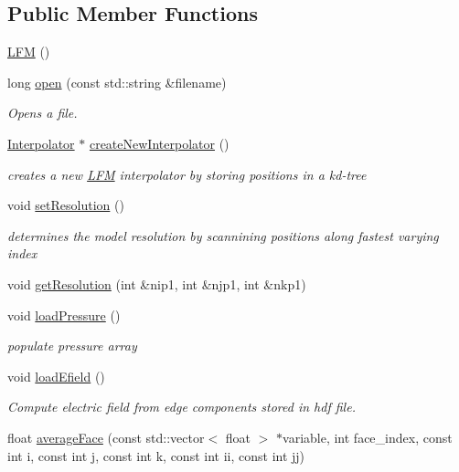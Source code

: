\subsection*{Public Member Functions}
\begin{DoxyCompactItemize}
\item 
\hyperlink{classccmc_1_1_l_f_m_a9fb6554dddcf4bb70bbb19622130cf69}{L\-F\-M} ()
\item 
long \hyperlink{classccmc_1_1_l_f_m_a8a9e74e6951db85a54cffbf6c1305f9f}{open} (const std\-::string \&filename)
\begin{DoxyCompactList}\small\item\em Opens a file.  \end{DoxyCompactList}\item 
\hyperlink{classccmc_1_1_interpolator}{Interpolator} $\ast$ \hyperlink{classccmc_1_1_l_f_m_a6cda025f32e66de186e723f7d16e8639}{create\-New\-Interpolator} ()
\begin{DoxyCompactList}\small\item\em creates a new \hyperlink{classccmc_1_1_l_f_m}{L\-F\-M} interpolator by storing positions in a kd-\/tree \end{DoxyCompactList}\item 
void \hyperlink{classccmc_1_1_l_f_m_a3b30357fb47547a19b480a824aae19ef}{set\-Resolution} ()
\begin{DoxyCompactList}\small\item\em determines the model resolution by scannining positions along fastest varying index \end{DoxyCompactList}\item 
void \hyperlink{classccmc_1_1_l_f_m_ae4a27c5fc9f52300575eb495beaeda9c}{get\-Resolution} (int \&nip1, int \&njp1, int \&nkp1)
\item 
void \hyperlink{classccmc_1_1_l_f_m_a50299b9da81da02df430d0079d8deaf5}{load\-Pressure} ()
\begin{DoxyCompactList}\small\item\em populate pressure array \end{DoxyCompactList}\item 
void \hyperlink{classccmc_1_1_l_f_m_a3159c537415c5da69c86ed5bc8791019}{load\-Efield} ()
\begin{DoxyCompactList}\small\item\em Compute electric field from edge components stored in hdf file. \end{DoxyCompactList}\item 
float \hyperlink{classccmc_1_1_l_f_m_a950345d5557b42e68ebd8e8d8b4a4a44}{average\-Face} (const std\-::vector$<$ float $>$ $\ast$variable, int face\-\_\-index, const int i, const int j, const int k, const int ii, const int jj)

\end{DoxyCompactItemize}
